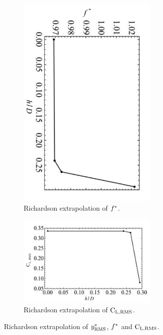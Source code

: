 \documentclass[oneside]{utmthesis}
\begin{document}
\begin{figure}
  \begin{subfigure}[h]{1\textwidth}
    \hspace{1.9cm}
    \includegraphics[angle=90,width=0.75\textwidth,trim={0 0.3cm 0.5cm 0.2cm},clip]{figs/gciFstr-1a}
    \caption{Richardson extrapolation of $f^{*}$.}
    \label{fig:gciFstr-1}
  \end{subfigure}

  \begin{subfigure}[h]{1\textwidth}
    \hspace{1.9cm}
    \includegraphics[width=0.75\textwidth,trim={0.2cm 0 0.25cm 0.5cm},clip]{figs/gciClrms-1a}
    \caption{Richardson extrapolation of $\text{C}_{\text{L,RMS}}$.}
    \label{fig:gciClrms-1}
  \end{subfigure}
  \caption{Richardson extrapolation of $y^{*}_{\text{RMS}}$, $f^{*}$ and $\text{C}_{\text{L,RMS}}$.} \label{fig:gciRichardson}
\end{figure}
\end{document}
